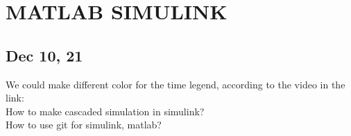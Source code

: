 \section{MATLAB SIMULINK}

\subsection{Dec 10, 21}

We could make different color for the time legend, 
according to the video in the link: 
\\

How to make cascaded simulation in simulink?\\

How to use git for simulink, matlab?